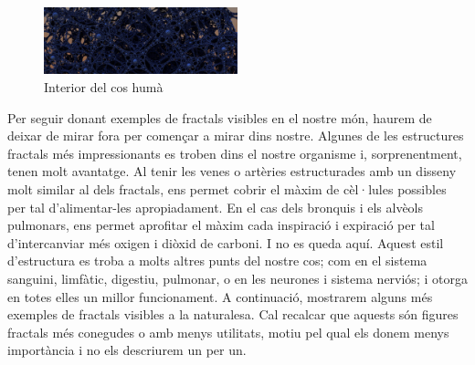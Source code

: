 \documentclass[12pt]{report}
\begin{document}
\begin{figure}
    \includegraphics[width=0.5\textwidth]{fractalcuerpo.jpg}
    \caption{Interior del cos humà}
    \end{figure}
Per seguir donant exemples de fractals visibles en el nostre món, haurem de deixar de mirar fora per començar a mirar dins nostre. Algunes de les estructures fractals més impressionants es troben dins el nostre organisme i, sorprenentment, tenen molt avantatge. Al tenir les venes o artèries estructurades amb un disseny molt similar al dels fractals, ens permet cobrir el màxim de cèl·lules possibles per tal d'alimentar-les apropiadament. En el cas dels bronquis i els alvèols pulmonars, ens permet aprofitar el màxim cada inspiració i expiració per tal d'intercanviar més oxigen i diòxid de carboni. I no es queda aquí. Aquest estil d'estructura es troba a molts altres punts del nostre cos; com en el sistema sanguini, limfàtic, digestiu, pulmonar, o en les neurones i sistema nerviós; i otorga en totes elles un millor funcionament.
\newline
A continuació, mostrarem alguns més exemples de fractals visibles a la naturalesa. Cal recalcar que aquests són figures fractals més conegudes o amb menys utilitats, motiu pel qual els donem menys importància i no els descriurem un per un.
\newline
\end{document}
